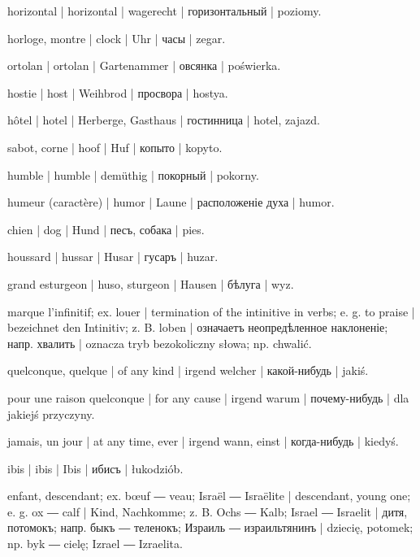 \begin{outdent}{1em}
horizontal | horizontal | wagerecht | горизонтальный | poziomy.

horloge, montre | clock | Uhr | часы | zegar.

ortolan | ortolan | Gartenammer | овсянка | poświerka.

hostie | host | Weihbrod | просвора | hostya.

hôtel | hotel | Herberge, Gasthaus | гостинница | hotel,
zajazd.

sabot, corne | hoof | Huf | копыто | kopyto.

humble | humble | demüthig | покорный | pokorny.

humeur (caractère) | humor | Laune | расположеніе духа | humor.

chien | dog | Hund | песъ, собака | pies.

houssard | hussar | Husar | гусаръ | huzar.

grand esturgeon | huso, sturgeon | Hausen | бѣлуга | wyz.


marque l’infinitif; ex.  louer | termination of the
intinitive in verbs; e. g.  to praise | bezeichnet den
Intinitiv; z. B.  loben | означаетъ неопредѣленное наклоненіе;
напр.  хвалить | oznacza tryb bezokoliczny słowa; np. 
chwalić.

quelconque, quelque | of any kind | irgend welcher | какой-нибудь | jakiś.

pour une raison quelconque | for any cause | irgend warum | почему-нибудь | dla jakiejś przyczyny.

jamais, un jour | at any time, ever | irgend wann, einst | когда-нибудь | kiedyś.

ibis | ibis | Ibis | ибисъ | łukodziób.

enfant, descendant; ex.  bœuf ―  veau;
 Israël ―  Israëlite | descendant, young one;
e. g.  ox ―  calf | Kind, Nachkomme; z. B. 
Ochs ―  Kalb;  Israel ―  Israelit | дитя, потомокъ; напр.  быкъ ―  теленокъ; 
Израиль ―  израильтянинъ | dziecię, potomek; np. 
byk ―  cielę;  Izrael ―  Izraelita.


\end{outdent}
